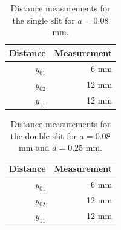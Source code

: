 \begin{table}[ht!]
	\centering
	\begin{tabular}{|r|r|} \hline
		Distance & Measurement \\
		\hline
		$y_{01}$ & 6 mm \\
		$y_{02}$ & 12 mm \\
		$y_{11}$ & 12 mm \\
		\hline
	\end{tabular}
	\caption{Distance measurements for the single slit for $a = 0.08$ mm.}
	\label{part1.single}
\end{table}
\begin{table}[ht!]
	\centering
	\begin{tabular}{|r|r|} \hline
		Distance & Measurement \\
		\hline
		$y_{01}$ & 6 mm \\
		$y_{02}$ & 12 mm \\
		$y_{11}$ & 12 mm \\
		\hline
	\end{tabular}
	\caption{Distance measurements for the double slit for $a = 0.08$ mm and $d = 0.25$ mm.}
	\label{part1.double}
\end{table}
\newpage
